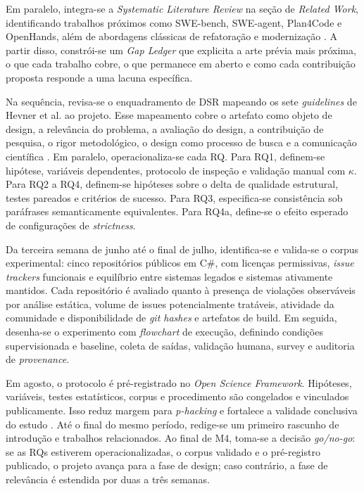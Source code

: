 \documentclass[12pt,a4paper]{article}
\begin{document}
Em paralelo, integra-se a \textit{Systematic Literature Review} na seção de \textit{Related Work}, identificando trabalhos próximos como SWE-bench, SWE-agent, Plan4Code e OpenHands, além de abordagens clássicas de refatoração e modernização \cite{yang2024sweagent, feathers2004, fowler1999}. A partir disso, constrói-se um \textit{Gap Ledger} que explicita a arte prévia mais próxima, o que cada trabalho cobre, o que permanece em aberto e como cada contribuição proposta responde a uma lacuna específica.

Na sequência, revisa-se o enquadramento de DSR mapeando os sete \textit{guidelines} de Hevner et al. ao projeto. Esse mapeamento cobre o artefato como objeto de design, a relevância do problema, a avaliação do design, a contribuição de pesquisa, o rigor metodológico, o design como processo de busca e a comunicação científica \cite{hevner2004}. Em paralelo, operacionaliza-se cada RQ. Para RQ1, definem-se hipótese, variáveis dependentes, protocolo de inspeção e validação manual com $\kappa$. Para RQ2 a RQ4, definem-se hipóteses sobre o delta de qualidade estrutural, testes pareados e critérios de sucesso. Para RQ3, especifica-se consistência sob paráfrases semanticamente equivalentes. Para RQ4a, define-se o efeito esperado de configurações de \textit{strictness}.

Da terceira semana de junho até o final de julho, identifica-se e valida-se o corpus experimental: cinco repositórios públicos em C\#, com licenças permissivas, \textit{issue trackers} funcionais e equilíbrio entre sistemas legados e sistemas ativamente mantidos. Cada repositório é avaliado quanto à presença de violações observáveis por análise estática, volume de issues potencialmente tratáveis, atividade da comunidade e disponibilidade de \textit{git hashes} e artefatos de build. Em seguida, desenha-se o experimento com \textit{flowchart} de execução, definindo condições supervisionada e baseline, coleta de saídas, validação humana, survey e auditoria de \textit{provenance}.

Em agosto, o protocolo é pré-registrado no \textit{Open Science Framework}. Hipóteses, variáveis, testes estatísticos, corpus e procedimento são congelados e vinculados publicamente. Isso reduz margem para \textit{p-hacking} e fortalece a validade conclusiva do estudo \cite{wohlin2012}. Até o final do mesmo período, redige-se um primeiro rascunho de introdução e trabalhos relacionados. Ao final de M4, toma-se a decisão \textit{go/no-go}: se as RQs estiverem operacionalizadas, o corpus validado e o pré-registro publicado, o projeto avança para a fase de design; caso contrário, a fase de relevância é estendida por duas a três semanas.
\end{document}
